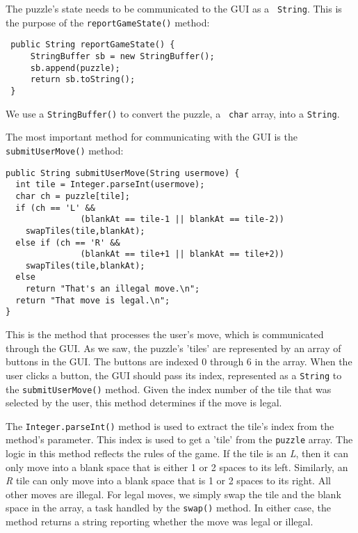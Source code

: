 The puzzle's state needs to be communicated to the GUI as a {\tt
String}. This is the purpose of the {\tt reportGameState()} method:

\begin{jjjlisting}
\begin{lstlisting}
 public String reportGameState() {   
     StringBuffer sb = new StringBuffer();
     sb.append(puzzle);
     return sb.toString();
 }
\end{lstlisting}
\end{jjjlisting}

\noindent We use a {\tt StringBuffer()} to convert the puzzle, a {\tt
char} array, into a {\tt String}.

The most important method for communicating with the GUI is the {\tt
submitUserMove()} method:

\begin{jjjlisting}
\begin{lstlisting}
public String submitUserMove(String usermove) {   
  int tile = Integer.parseInt(usermove);
  char ch = puzzle[tile];
  if (ch == 'L' && 
               (blankAt == tile-1 || blankAt == tile-2))
    swapTiles(tile,blankAt);
  else if (ch == 'R' && 
               (blankAt == tile+1 || blankAt == tile+2))
    swapTiles(tile,blankAt);
  else 
    return "That's an illegal move.\n";
  return "That move is legal.\n";
}
\end{lstlisting}
\end{jjjlisting}

\noindent This is the method that processes the user's move, which is
communicated through the GUI. As we saw, the puzzle's 'tiles' are
represented by an array of buttons in the GUI.  The buttons are
indexed 0 through 6 in the array. When the user clicks a button,
the GUI should pass its index, represented as a {\tt String} to the
{\tt submitUserMove()} method.  Given the index number of the tile
that was selected by the user, this method determines if the move is
legal.

The {\tt Integer.parseInt()} method is used to extract the tile's
index from the method's parameter. This index is used to get a 'tile'
from the {\tt puzzle} array. The logic in this method reflects the
rules of the game. If the tile is an {\em L}, then it can only move
into a blank space that is either 1 or 2 spaces to its left.
Similarly, an {\em R} tile can only move into a blank space that is 1
or 2 spaces to its right. All other moves are illegal. For legal
moves, we simply swap the tile and the blank space in the array, a
task handled by the {\tt swap()} method.  In either case, the method
returns a string reporting whether the move was legal or illegal.

